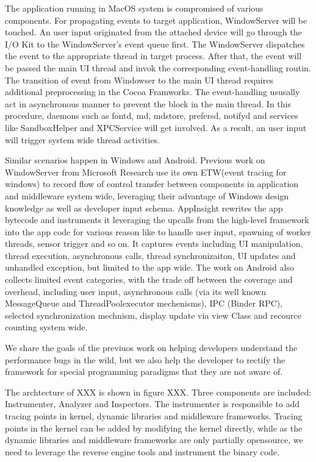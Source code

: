 The application running in MacOS system is compromised of various components.
For propagating events to target application, WindowServer will be touched.
An user input originated from the attached device will go through the I/O Kit to the WindowServer's event queue first.
The WindowServer dispatches the event to the appropriate thread in target process.
After that, the event will be passed the main UI thread and invok the corresponding event-handling routin. 
The transition of event from Windowser to the main UI thread requires additional preprocessing in the Cocoa Framworks.
The event-handling ususally act in asynchronous manner to prevent the block in the main thread.
In this procedure, daemons such as fontd, md, mdstore, prefersd, notifyd and services like SandboxHelper and XPCService will get involved.
As a result, an user input will trigger system wide thread activities.
\par
Similar scenarios happen in Windows and Android.
Previous work on WindowServer from Microsoft Research use its own ETW(event tracing for windows) to record flow of control transfer between components in application and middleware system wide, leveraging their advantage of Windows design knowledge as well as developer input schema.
AppInsight rewrites the app bytecode and instruments it leveraging the upcalls from the high-level framework into the app code for various reason like to handle user input, spawning of worker threads, sensor trigger and so on.
It captures events including UI manipulation, thread execution, asynchronous calls, thread synchronizaiton, UI updates and unhandled exception, but limited to the app wide.
The work on Android also collects limited event categories, with the trade off between the coverage and overhead, including user input, asynchronous calls (via its well known MessageQueue and ThreadPoolexecutor mechenisms), IPC (Binder RPC), selected synchronization mechnism, display update via view Class and recource counting system wide.
\par
We share the goals of the previuos work on helping developers understand the performance bugs in the wild, but we also help the developer to rectify the framework for special programming paradigms that they are not aware of. 
\par
The archtecture of XXX is shown in figure XXX.
Three components are included: Instrumenter, Analyzer and Inspectors.
The instrumenter is responsible to add tracing points in kernel, dynamic libraries and middleware frameworks.
Tracing points in the kernel can be added by modifying the kernel directly, while as the dynamic libraries and middleware frameworks are only partially opensource, we need to leverage the reverse engine tools and instrument the binary code.
